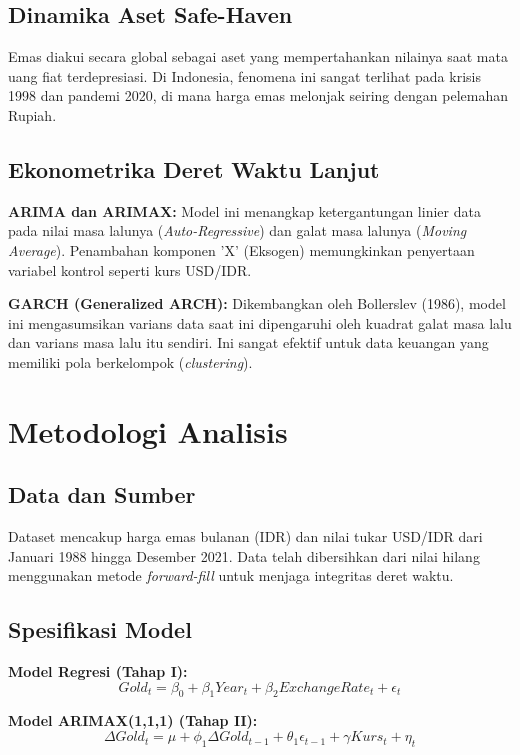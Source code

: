 \documentclass[12pt, a4paper]{article}
\begin{document}
\subsection{Dinamika Aset Safe-Haven}
Emas diakui secara global sebagai aset yang mempertahankan nilainya saat mata uang fiat terdepresiasi. Di Indonesia, fenomena ini sangat terlihat pada krisis 1998 dan pandemi 2020, di mana harga emas melonjak seiring dengan pelemahan Rupiah.

\subsection{Ekonometrika Deret Waktu Lanjut}
\textbf{ARIMA dan ARIMAX:} Model ini menangkap ketergantungan linier data pada nilai masa lalunya (\textit{Auto-Regressive}) dan galat masa lalunya (\textit{Moving Average}). Penambahan komponen 'X' (Eksogen) memungkinkan penyertaan variabel kontrol seperti kurs USD/IDR.

\textbf{GARCH (Generalized ARCH):} Dikembangkan oleh Bollerslev (1986), model ini mengasumsikan varians data saat ini dipengaruhi oleh kuadrat galat masa lalu dan varians masa lalu itu sendiri. Ini sangat efektif untuk data keuangan yang memiliki pola berkelompok (\textit{clustering}).

\section{Metodologi Analisis}
\subsection{Data dan Sumber}
Dataset mencakup harga emas bulanan (IDR) dan nilai tukar USD/IDR dari Januari 1988 hingga Desember 2021. Data telah dibersihkan dari nilai hilang menggunakan metode \textit{forward-fill} untuk menjaga integritas deret waktu.

\subsection{Spesifikasi Model}
\textbf{Model Regresi (Tahap I):}
\begin{equation}
    Gold_t = \beta_0 + \beta_1 Year_t + \beta_2 ExchangeRate_t + \epsilon_t
\end{equation}

\textbf{Model ARIMAX(1,1,1) (Tahap II):}
\begin{equation}
    \Delta Gold_t = \mu + \phi_1 \Delta Gold_{t-1} + \theta_1 \epsilon_{t-1} + \gamma Kurs_t + \eta_t
\end{equation}
\end{document}

